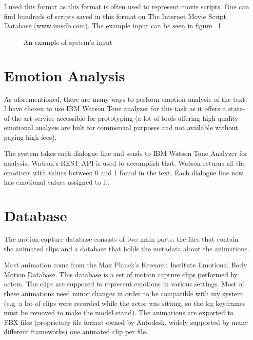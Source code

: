 I used this format as this format is often used to represent movie scripts. One can find hundreds of scripts saved in this format on The Internet Movie Script Database (\url{www.imsdb.com}). The example input can be seen in figure ~\ref{fig:inputscript}.


\begin{figure}[!ht]
\centerline{}
\caption{An example of system's input}\label{fig:inputscript}
\end{figure}


\section{Emotion Analysis} 
\label{sec:emoanal}
As aforementioned, there are many ways to perform emotion analysis of the text. I have chosen to use IBM Watson Tone analyzer for this task as it offers a state-of-the-art service accessible for prototyping (a lot of tools offering high quality emotional analysis are bult for commercial purposes and not available without paying high fees).

The system takes each dialogue line and sends to IBM Watson Tone Analyzer for analysis. Watson's REST API is used to accomplish that. Watson returns all the emotions with values between 0 and 1 found in the text. Each dialogue line now has emotional values assigned to it.

\section{Database}

The motion capture database consists of two main parts: the files that contain the animated clips and a database that holds the metadata about the animations.

Most animation come from the Max Planck's Research Institute Emotional Body Motion Database. This database is a set of motion capture clips performed by actors. The clips are supposed to represent emotions in various settings. Most of these animations need minor changes in order to be compatible with my system (e.g. a lot of clips were recorded while the actor was sitting, so the leg keyframes must be removed to make the model stand). The animations are exported to FBX files (proprietary file format owned by Autodesk, widely supported by many different frameworks) one animated clip per file.

